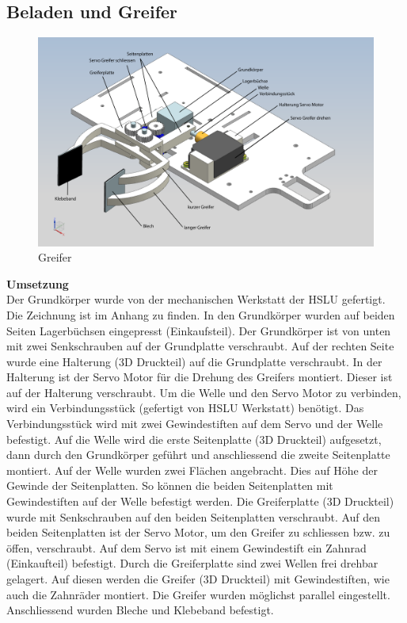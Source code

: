 \newpage
\subsection{Beladen und Greifer}
\begin{figure}[H]
\centering
\includegraphics[width=1\textwidth]{03_Loesungskonzept/pictures/Greifer2.png}
\caption{Greifer}
\end{figure}
\textbf{Umsetzung}\\[0.2cm]
Der Grundkörper wurde von der mechanischen Werkstatt der HSLU gefertigt. Die Zeichnung ist im Anhang zu finden. In den Grundkörper wurden auf beiden Seiten Lagerbüchsen eingepresst (Einkaufsteil). Der Grundkörper ist von unten mit zwei Senkschrauben auf der Grundplatte verschraubt.
Auf der rechten Seite wurde eine Halterung (3D Druckteil) auf die Grundplatte verschraubt. In der Halterung ist der Servo Motor für die Drehung des Greifers montiert. Dieser ist auf der Halterung verschraubt. Um die Welle und den Servo Motor zu verbinden, wird ein Verbindungsstück (gefertigt von HSLU Werkstatt) benötigt. Das Verbindungsstück wird mit zwei Gewindestiften auf dem Servo und der Welle befestigt. Auf die Welle wird die erste Seitenplatte (3D Druckteil) aufgesetzt, dann durch den Grundkörper geführt und anschliessend die zweite Seitenplatte montiert. Auf der Welle wurden zwei Flächen angebracht. Dies auf Höhe der Gewinde der Seitenplatten. So können die beiden Seitenplatten mit Gewindestiften auf der Welle befestigt werden. Die Greiferplatte (3D Druckteil) wurde mit Senkschrauben auf den beiden Seitenplatten verschraubt. 
Auf den beiden Seitenplatten ist der Servo Motor, um den Greifer zu schliessen bzw. zu öffen, verschraubt. Auf dem Servo ist mit einem Gewindestift ein Zahnrad (Einkaufteil) befestigt. Durch die Greiferplatte sind zwei Wellen frei drehbar gelagert. Auf diesen werden die Greifer (3D Druckteil) mit Gewindestiften, wie auch die Zahnräder montiert. Die Greifer wurden möglichst parallel eingestellt. Anschliessend wurden Bleche und Klebeband befestigt.
